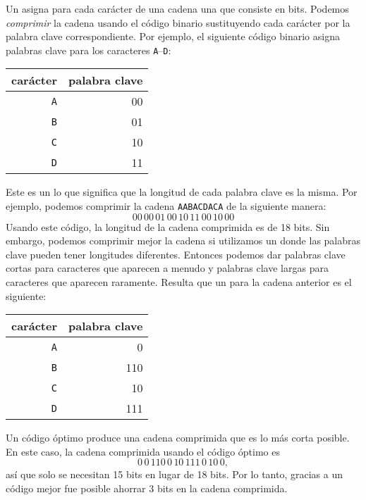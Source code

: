 
Un  asigna para cada carácter
de una cadena una  que consiste en bits.
Podemos \emph{comprimir} la cadena usando el código binario
sustituyendo cada carácter por la
palabra clave correspondiente.
Por ejemplo, el siguiente código binario
asigna palabras clave para los caracteres
\texttt{A}–\texttt{D}:
\begin{center}
\begin{tabular}{rr}
carácter & palabra clave \\
\hline
\texttt{A} & 00 \\
\texttt{B} & 01 \\
\texttt{C} & 10 \\
\texttt{D} & 11 \\
\end{tabular}
\end{center}
Este es un 
lo que significa que la longitud de cada
palabra clave es la misma.
Por ejemplo, podemos comprimir la cadena
\texttt{AABACDACA} de la siguiente manera:
\[00\,00\,01\,00\,10\,11\,00\,10\,00\]
Usando este código, la longitud de la cadena comprimida
es de 18 bits.
Sin embargo, podemos comprimir mejor la cadena
si utilizamos un 
donde las palabras clave pueden tener longitudes diferentes.
Entonces podemos dar palabras clave cortas para
caracteres que aparecen a menudo
y palabras clave largas para caracteres
que aparecen raramente.
Resulta que un 
para la cadena anterior es el siguiente:
\begin{center}
\begin{tabular}{rr}
carácter & palabra clave \\
\hline
\texttt{A} & 0 \\
\texttt{B} & 110 \\
\texttt{C} & 10 \\
\texttt{D} & 111 \\
\end{tabular}
\end{center}
Un código óptimo produce una cadena comprimida
que es lo más corta posible.
En este caso, la cadena comprimida usando
el código óptimo es
\[0\,0\,110\,0\,10\,111\,0\,10\,0,\]
así que solo se necesitan 15 bits en lugar de 18 bits.
Por lo tanto, gracias a un código mejor fue posible
ahorrar 3 bits en la cadena comprimida.

